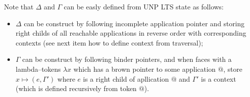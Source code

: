 \documentclass[a4paper, 10pt]{article}
\begin{document}
Note that $\Delta$ and $\Gamma$ can be easly defined from UNP LTS state as follows:
\begin{itemize}
\item $\Delta$ can be construct by following incomplete application pointer and storing right childs of all reachable applications in reverse order with corresponding contexts (see next item how to define context from traversal);
\item $\Gamma$ can be construct by following binder pointers, and when faces with a lambda--tokens $\lambda x$ which has a brown pointer to some application $@$, store $x \mapsto (e, \Gamma')$ where $e$ is a right child of apllication $@$ and $\Gamma'$ is a context (which is defined recursively from token $@$).
\end{itemize}






\end{document}
